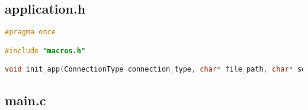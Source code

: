 \subsection{application.h}

\begin{lstlisting}[language=C, caption=application.h]
#pragma once

#include "macros.h"

void init_app(ConnectionType connection_type, char* file_path, char* serial_path);

\end{lstlisting}

\subsection{main.c}

